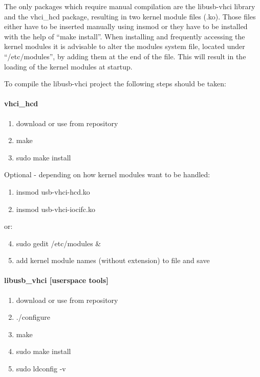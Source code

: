 The only packages which require manual compilation are the libusb-vhci library and the vhci\_hcd package, 
resulting in two kernel module files (.ko). Those files either have to be inserted manually using insmod 
or they have to be installed with the help of ``make install''. When installing and frequently accessing the 
kernel modules it is advisable to alter the modules system file, located under “/etc/modules”, by adding 
them at the end of the file. This will result in the loading of the kernel modules at startup.

To compile the libusb-vhci project the following steps should be taken:

\paragraph{vhci\_hcd}

\begin{enumerate}
 \item download or use from repository
 \item make
 \item sudo make install
\end{enumerate}

Optional - depending on how kernel modules want to be handled:

\begin{enumerate}[resume]
 \item insmod usb-vhci-hcd.ko
 \item insmod usb-vhci-iocifc.ko
\end{enumerate}
 
or:
 
\begin{enumerate}
\setcounter{enumi}{3}
 \item sudo gedit /etc/modules \&
 \item add kernel module names (without extension) to file and save
\end{enumerate}

\paragraph{libusb\_vhci [userspace tools]}

\begin{enumerate}
 \item download or use from repository
 \item ./configure
 \item make
 \item sudo make install
 \item sudo ldconfig -v 
\end{enumerate}


